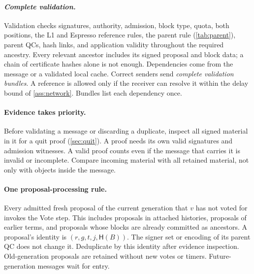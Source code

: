 \documentclass[11pt,a4paper]{article}
\newcommand{\Hash}{\mathsf H}
\newcommand{\defterm}[1]{\textcolor{rrBlue}{\textit{#1}}}
\begin{document}
\paragraph{\defterm{Complete validation.}}
Validation checks signatures, authority, admission, block type, quota,
both positions, the L1 and Espresso reference rules, the parent rule
(\cref{tab:parent}), parent QCs, hash links, and application validity
throughout the required ancestry. Every relevant ancestor includes its
signed proposal and block data; a chain of certificate hashes alone is
not enough. Dependencies come from the message or a validated local
cache. Correct senders send \defterm{complete validation bundles}. A reference is
allowed only if the receiver can resolve it within the delay bound of
\cref{ass:network}. Bundles list each dependency once.

\paragraph{Evidence takes priority.}
Before validating a message or discarding a duplicate, inspect all signed
material in it for a quit proof (\cref{sec:quit}). A proof needs its own
valid signatures and admission witnesses. A valid proof counts even if
the message that carries it is invalid or incomplete. Compare incoming
material with all retained material, not only with objects inside the
message.

\paragraph{One proposal-processing rule.}
Every admitted fresh proposal of the current generation that $v$ has not
voted for invokes the Vote step. This includes proposals in attached
histories, proposals of earlier terms, and proposals whose blocks are
already committed as ancestors. A proposal's identity is
$(r,g,t,j,\Hash(B))$. The signer set or encoding of its parent QC does
not change it. Deduplicate by this identity after evidence inspection.
Old-generation proposals are retained without new votes or timers.
Future-generation messages wait for entry.
\end{document}
